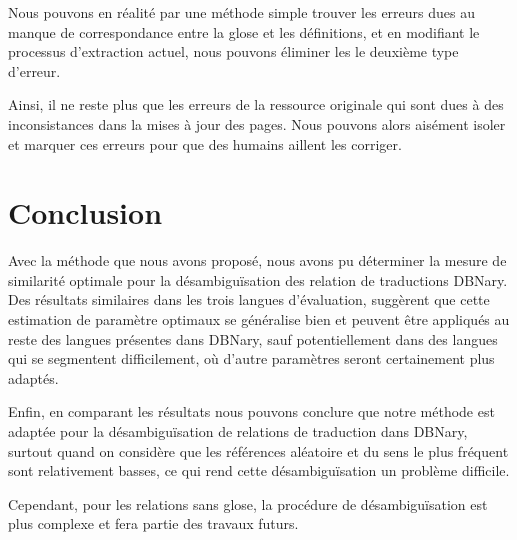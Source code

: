 \documentclass[10pt,a4paper,twoside]{article}
\begin{document}
Nous pouvons en réalité par une méthode simple trouver les erreurs dues au manque de correspondance entre la glose et les définitions, et en modifiant le processus d'extraction actuel, nous pouvons éliminer les le deuxième type d'erreur.

Ainsi, il ne reste plus que les erreurs de la ressource originale qui sont dues à des inconsistances dans la mises à jour des pages. Nous pouvons alors aisément isoler et marquer ces erreurs pour que des humains aillent les corriger.

\section{Conclusion}

Avec la méthode que nous avons proposé, nous avons pu déterminer la mesure de similarité optimale pour la désambiguïsation des relation de traductions DBNary. Des résultats similaires dans les trois langues d'évaluation, suggèrent que cette estimation de paramètre optimaux se généralise bien et peuvent être appliqués au reste des langues présentes dans DBNary, sauf potentiellement dans des langues qui se segmentent difficilement, où d'autre paramètres seront certainement plus adaptés.

Enfin, en comparant les résultats nous pouvons conclure que notre méthode est adaptée pour la désambiguïsation de relations de traduction dans DBNary, surtout quand on considère que les références aléatoire et du sens le plus fréquent sont relativement basses, ce qui rend cette désambiguïsation un problème difficile.

Cependant, pour les relations sans glose, la procédure de désambiguïsation est plus complexe et fera partie des travaux futurs.





\end{document}
